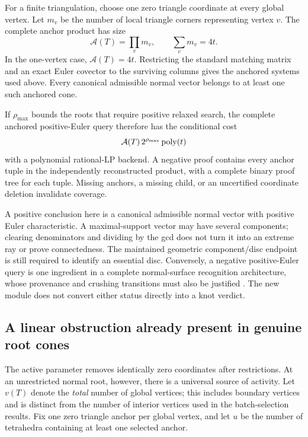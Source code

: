 For a finite triangulation, choose one zero triangle coordinate at every
global vertex.  Let $m_v$ be the number of local triangle corners representing
vertex $v$.  The complete anchor product has size
\[
 \mathcal A(T)=\prod_v m_v,\qquad \sum_v m_v=4t.
\]
In the one-vertex case, $\mathcal A(T)=4t$.  Restricting the standard matching
matrix and an exact Euler covector to the surviving columns gives the
anchored systems used above.  Every canonical admissible normal vector
belongs to at least one such anchored cone.

If $\rho_{\max}$ bounds the roots that require positive relaxed search, the
complete anchored positive-Euler query therefore has the conditional cost
\begin{equation}\label{eq:active-normal-cost}
 \mathcal A(T)\,2^{\rho_{\max}}\operatorname{poly}(t)
\end{equation}
with a polynomial rational-LP backend.  A negative proof contains every
anchor tuple in the independently reconstructed product, with a complete
binary proof tree for each tuple.  Missing anchors, a missing child, or an
uncertified coordinate deletion invalidate coverage.

A positive conclusion here is a canonical admissible normal vector with
positive Euler characteristic.  A maximal-support vector may have several
components; clearing denominators and dividing by the gcd does not turn it
into an extreme ray or prove connectedness.  The maintained geometric
component/disc endpoint is still required to identify an essential disc.
Conversely, a negative positive-Euler query is one ingredient in a complete
normal-surface recognition architecture, whose provenance and crushing
transitions must also be justified \cite{BurtonOzlen,priorDual}.  The new
module does not convert either status directly into a knot verdict.

\subsection{A linear obstruction already present in genuine root cones}

The active parameter removes identically zero coordinates after restrictions.
At an unrestricted normal root, however, there is a universal source of
activity.  Let $v(T)$ denote the \emph{total} number of global vertices; this
includes boundary vertices and is distinct from the number of interior
vertices used in the batch-selection results.  Fix one zero triangle anchor
per global vertex, and let $u$ be the number of tetrahedra containing at least
one selected anchor.

